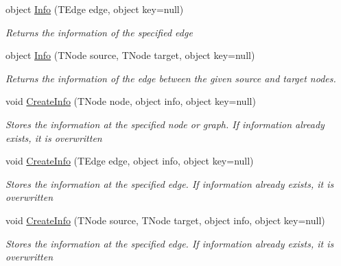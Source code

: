 \begin{DoxyCompactItemize}
object \hyperlink{class_graph_library_1_1_generics_1_1_abstract_graph_algorithm_a058caf0df4003a1336385f5d0c483023}{Info} (T\+Edge edge, object key=null)
\begin{DoxyCompactList}\small\item\em Returns the information of the specified edge \end{DoxyCompactList}\item 
object \hyperlink{class_graph_library_1_1_generics_1_1_abstract_graph_algorithm_a5e7832df95cf65108e8a1006b83251a0}{Info} (T\+Node source, T\+Node target, object key=null)
\begin{DoxyCompactList}\small\item\em Returns the information of the edge between the given source and target nodes. \end{DoxyCompactList}\item 
void \hyperlink{class_graph_library_1_1_generics_1_1_abstract_graph_algorithm_a2eae65a9111672ba14a6f992659ad47e}{Create\+Info} (T\+Node node, object info, object key=null)
\begin{DoxyCompactList}\small\item\em Stores the information at the specified node or graph. If information already exists, it is overwritten \end{DoxyCompactList}\item 
void \hyperlink{class_graph_library_1_1_generics_1_1_abstract_graph_algorithm_a17ed5f51aeb7550e989279f60875a3ee}{Create\+Info} (T\+Edge edge, object info, object key=null)
\begin{DoxyCompactList}\small\item\em Stores the information at the specified edge. If information already exists, it is overwritten \end{DoxyCompactList}\item 
void \hyperlink{class_graph_library_1_1_generics_1_1_abstract_graph_algorithm_a1c1e9c16c3303fd647af598cc1bbecb8}{Create\+Info} (T\+Node source, T\+Node target, object info, object key=null)
\begin{DoxyCompactList}\small\item\em Stores the information at the specified edge. If information already exists, it is overwritten \end{DoxyCompactList}\end{DoxyCompactItemize}
